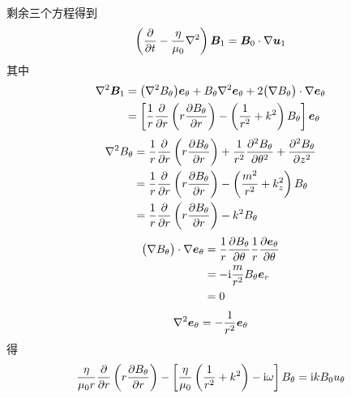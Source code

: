 剩余三个方程得到
\begin{equation}
\left( \frac{\partial {}}{\partial {t}} - \frac{\eta}{\mu_0} \nabla^2 {} \right) \bm{B}_1 = \bm{B}_0 \cdot \nabla {\bm{u}_1}
\end{equation}
其中
\begin{equation}\begin{aligned}
\nabla^2 {\bm{B}_1} &=
\big(\nabla^2 {B_\theta}\big) \bm{e}_\theta
+ B_\theta \nabla^2 {\bm{e}_\theta}
+ 2 \big(\nabla {B_\theta}\big) \cdot \nabla {\bm{e}_\theta} \\
&= \left[
\frac{1}{r} \frac{\partial {}}{\partial {r}} \left(r \frac{\partial {B_\theta}}{\partial {r}}\right)
- \left(\frac{1}{r^2} + k^2\right) B_\theta
\right] \bm{e}_\theta
\end{aligned}\end{equation}
\begin{equation}\begin{aligned}
\nabla^2 {B_\theta} &= \frac{1}{r} \frac{\partial {}}{\partial {r}} \left(r \frac{\partial {B_\theta}}{\partial {r}}\right)
+ \frac{1}{r^2} \frac{\partial^2 {B_\theta}}{\partial {\theta}^2}
+ \frac{\partial^2 {B_\theta}}{\partial {z}^2} \\
&= \frac{1}{r} \frac{\partial {}}{\partial {r}} \left(r \frac{\partial {B_\theta}}{\partial {r}}\right)
- \left(\frac{m^2}{r^2} + k_z^2\right) B_\theta \\
&= \frac{1}{r} \frac{\partial {}}{\partial {r}} \left(r \frac{\partial {B_\theta}}{\partial {r}}\right)
- k^2 B_\theta
\end{aligned}\end{equation}
\begin{equation}\begin{aligned}
\big(\nabla {B_\theta}\big) \cdot \nabla {\bm{e}_\theta}
&= \frac{1}{r} \frac{\partial {B_\theta}}{\partial {\theta}} \frac{1}{r} \frac{\partial {\bm{e}_\theta}}{\partial {\theta}} \\
&= - \mathrm{i} \frac{m}{r^2} B_\theta \bm{e}_r \\
&= 0
\end{aligned}\end{equation}
\begin{equation}
\nabla^2 {\bm{e}_\theta} = - \frac{1}{r^2} \bm{e}_\theta
\end{equation}
得
\begin{equation}
\frac{\eta}{\mu_0 r} \frac{\partial {}}{\partial {r}} \left(r \frac{\partial {B_\theta}}{\partial {r}}\right)
- \left[ \frac{\eta}{\mu_0} \left(\frac{1}{r^2} + k^2\right) - \mathrm{i} \omega \right] B_\theta
= \mathrm{i} k B_0 u_\theta
\end{equation}

